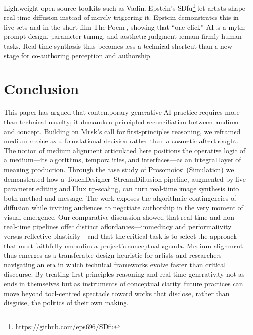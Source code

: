 \documentclass[sigconf,nonacm]{acmart}
\begin{document}
Lightweight open-source toolkits such as Vadim Epstein’s SDfu\footnote{\url{https://github.com/eps696/SDfu}} let artists shape real-time diffusion instead of merely triggering it. Epstein demonstrates this in live sets and in the short film The Poem \cite{epstein_wesual_2025,epstein_poem_2025}, showing that “one-click” AI is a myth: prompt design, parameter tuning, and aesthetic judgment remain firmly human tasks. Real-time synthesis thus becomes less a technical shortcut than a new stage for co-authoring perception and authorship.

\section{Conclusion}
This paper has argued that contemporary generative AI practice requires more than technical novelty; it demands a principled reconciliation between medium and concept. Building on Musk's call for first-principles reasoning, we reframed medium choice as a foundational decision rather than a cosmetic afterthought. The notion of medium alignment articulated here positions the operative logic of a medium—its algorithms, temporalities, and interfaces—as an integral layer of meaning production.
Through the case study of Prosomoíosi (Simulation) we demonstrated how a TouchDesigner–StreamDiffusion pipeline, augmented by live parameter editing and Flux up-scaling, can turn real-time image synthesis into both method and message. The work exposes the algorithmic contingencies of diffusion while inviting audiences to negotiate authorship in the very moment of visual emergence. Our comparative discussion showed that real-time and non-real-time pipelines offer distinct affordances—immediacy and performativity versus reflective plasticity—and that the critical task is to select the approach that most faithfully embodies a project's conceptual agenda.
Medium alignment thus emerges as a transferable design heuristic for artists and researchers navigating an era in which technical frameworks evolve faster than critical discourse. By treating first-principles reasoning and real-time generativity not as ends in themselves but as instruments of conceptual clarity, future practices can move beyond tool-centred spectacle toward works that disclose, rather than disguise, the politics of their own making.
\end{document}
